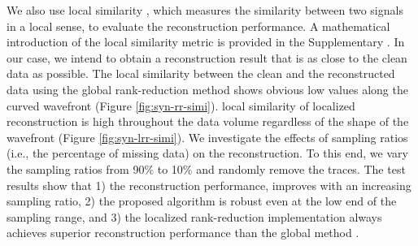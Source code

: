 We also use local similarity \cite{fomel2007localattr}, which measures the similarity between two signals in a local sense, to evaluate the reconstruction performance. A mathematical introduction of the local similarity metric is provided in the Supplementary . In our case, we intend to obtain a reconstruction result that is as close to the clean data as possible.  The local similarity between the clean and the reconstructed data using the global rank-reduction method shows obvious low values along the curved wavefront (Figure \ref{fig:syn-rr-simi}).  local similarity of localized reconstruction is high throughout the data volume regardless of the shape of the wavefront (Figure \ref{fig:syn-lrr-simi}). We  investigate the effects of sampling ratios (i.e., the percentage of missing data) on the reconstruction.  To this end, we vary the sampling ratios from 90\% to 10\% and randomly remove the traces. The test results show that 1) the reconstruction performance,  improves with an increasing sampling ratio, 2) the proposed algorithm is robust even at the low end  of the sampling range, and 3) the localized rank-reduction implementation always achieves superior reconstruction performance than the global method .

